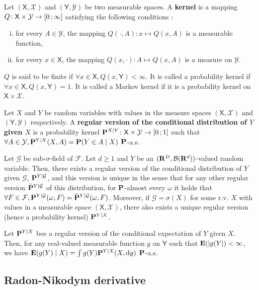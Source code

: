 	\begin{defn}
		Let $(\mathsf{X}, \mathcal{X})$ and $(\mathsf{Y}, \mathcal{Y})$ be two measurable spaces.
		A \textbf{kernel} is a mapping $Q \colon \mathsf{X} \times \mathcal{Y} \to \mathopen{}\mathclose{\left[0\mathclose{}\mathpunct{};\infty\right]}$ satisfying the following conditions :
		\begin{enumerate}[(i)]
			\item for every $A \in \mathcal{Y}$, the mapping $Q(\cdot, A) \colon x \mapsto Q(x,A)$ is a measurable function,
			\item for every $x \in \mathsf{X}$, the mapping $Q(x, \cdot) \colon A \mapsto Q(x,A)$ is a measure on $\mathcal{Y}$.
		\end{enumerate}
		$Q$ is said to be finite if $\forall x \in \mathsf{X}, Q(x,\mathsf{Y}) < \infty$.
		It is called a probability kernel if $\forall x \in \mathsf{X}, Q(x,\mathsf{Y}) = 1$.
		It is called a Markov kernel if it is a probability kernel on $\mathsf{X} \times \mathcal{X}$.
	\end{defn}

	\begin{defn}
		Let $X$ and $Y$ be random variables with values in the measure spaces $(\mathsf{X},\mathcal{X})$ and $(\mathsf{Y},\mathcal{Y})$ respectively.
		A \textbf{regular version of the conditional distribution of $Y$ given $X$} is a probability kernel $\mathbf{P}^{X \mid Y} \colon \mathsf{X} \times \mathcal{Y} \to \mathopen{}\mathclose{\left[0\mathclose{}\mathpunct{};1\right]}$ such that $\forall A \in \mathcal{Y}, \mathbf{P}^{Y \mid X}(X,A) = \mathbf{P}(Y \in A \mid X)$ $\mathbf{P}$-a.s.
	\end{defn}

	\begin{thm}
		Let $\mathcal{G}$ be sub-$\sigma$-field of $\mathcal{F}$.
		Let $d \geq 1$ and $Y$ be an $(\mathbf{R}^D, \mathcal{B}(\mathbf{R}^d))$-valued random variable.
		Then, there exists a regular version of the conditional distribution of $Y$ given $\mathcal{G}$, $\mathbf{P}^{Y \mid \mathcal{G}}$, and this version is unique in the sense that for any other regular version $\bar{\mathbf{P}}^{Y \mid \mathcal{G}}$ of this distribution, for $\mathbf{P}$-almost every $\omega$ it holds that $\forall F \in \mathcal{F}, \mathbf{P}^{Y \mid \mathcal{G}}(\omega,F) = \bar{\mathbf{P}}^{Y \mid \mathcal{G}}(\omega,F)$.
		Moreover, if $\mathcal{G} = \sigma(X)$ for some r.v. $X$ with values in a measurable space $(\mathsf{X},\mathcal{X})$, there also exists a unique regular version (hence a probability kernel) $\mathbf{P}^{Y \mid X}$.
	\end{thm}

	\begin{lem}
		Let $\mathbf{P}^{Y \mid X}$ bee a regular version of the conditional expectation of $Y$ given $X$.
		Then, for any real-valued measurable function $g$ on $\mathsf{Y}$ such that $\mathbf{E}(\left\lvert g(Y\right\rvert) < \infty$, we have $\mathbf{E}(g(Y) \mid X) = \int g(Y) \mathbf{P}^{Y \mid X}(X, \mathop{}\mathopen{}\mathrm{d} y)$ $\mathbf{P}$-a.s.
	\end{lem}

	\begin{pop}
		
	\end{pop}


\subsection{Radon-Nikodym derivative}
